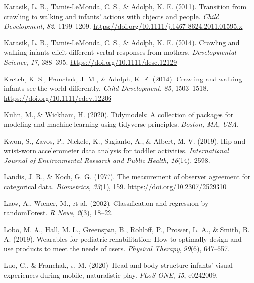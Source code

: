 \documentclass[
  man]{apa6}
\newlength{\cslhangindent}
\newlength{\cslentryspacingunit} %
\newenvironment{CSLReferences}[2] %
 {%
  \setlength{\parindent}{0pt}
  \ifodd #1
  \let\oldpar\par
  \def\par{\hangindent=\cslhangindent\oldpar}
  \fi
  \setlength{\parskip}{#2\cslentryspacingunit}
 }%
 {}
\begin{document}
\begin{CSLReferences}{1}{0}
\leavevmode{}%
Karasik, L. B., Tamis-LeMonda, C. S., \& Adolph, K. E. (2011). Transition from crawling to walking and infants' actions with objects and people. \emph{Child Development}, \emph{82}, 1199--1209. \url{https://doi.org/10.1111/j.1467-8624.2011.01595.x}

\leavevmode{}%
Karasik, L. B., Tamis-LeMonda, C. S., \& Adolph, K. E. (2014). Crawling and walking infants elicit different verbal responses from mothers. \emph{Developmental Science}, \emph{17}, 388--395. \url{https://doi.org/10.1111/desc.12129}

\leavevmode{}%
Kretch, K. S., Franchak, J. M., \& Adolph, K. E. (2014). Crawling and walking infants see the world differently. \emph{Child Development}, \emph{85}, 1503--1518. \url{https://doi.org/10.1111/cdev.12206}

\leavevmode{}%
Kuhn, M., \& Wickham, H. (2020). Tidymodels: A collection of packages for modeling and machine learning using tidyverse principles. \emph{Boston, MA, USA}.

\leavevmode{}%
Kwon, S., Zavos, P., Nickele, K., Sugianto, A., \& Albert, M. V. (2019). Hip and wrist-worn accelerometer data analysis for toddler activities. \emph{International Journal of Environmental Research and Public Health}, \emph{16}(14), 2598.

\leavevmode{}%
Landis, J. R., \& Koch, G. G. (1977). The measurement of observer agreement for categorical data. \emph{Biometrics}, \emph{33}(1), 159. \url{https://doi.org/10.2307/2529310}

\leavevmode{}%
Liaw, A., Wiener, M., et al. (2002). Classification and regression by randomForest. \emph{R News}, \emph{2}(3), 18--22.

\leavevmode{}%
Lobo, M. A., Hall, M. L., Greenspan, B., Rohloff, P., Prosser, L. A., \& Smith, B. A. (2019). Wearables for pediatric rehabilitation: How to optimally design and use products to meet the needs of users. \emph{Physical Therapy}, \emph{99}(6), 647--657.

\leavevmode{}%
Luo, C., \& Franchak, J. M. (2020). Head and body structure infants' visual experiences during mobile, naturalistic play. \emph{{PLoS ONE}}, \emph{15}, e0242009.


\end{CSLReferences}
\end{document}
